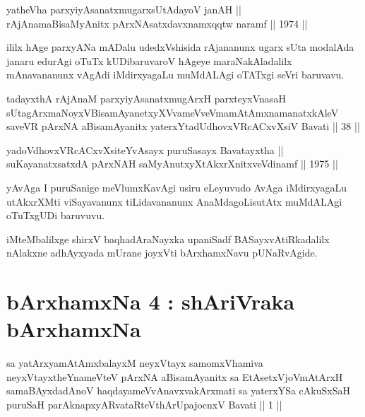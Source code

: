 
\begin{shl}
yatheVha parxyiyAsanatxmugarxsUtAdayoV janAH || \\
rAjAnamaBisaMyAnitx pArxNAsatxdavxnamxqqtw naramf \hfill || 1974 ||
  
\end{shl}

\begin{artha}
ililx hAge parxyANa mADalu udedxVshisida rAjananunx ugarx sUta
modalAda janaru edurAgi oTuTx kUDibaruvaroV hAgeye maraNakAladalilx
mAnavananunx vAgAdi iMdirxyagaLu muMdALAgi oTATxgi seVri baruvavu.
\end{artha}

\begin{shl}
tadayxthA rAjAnaM parxyiyAsanatxmugArxH parxteyxVnasaH sUtagArxmaNoyxV\s BisamAyanetxyXVvameVveVmamAtAmxnamanatxkAleV saveVR pArxNA aBisamAyanitx yaterxYtadUdhovxVRcACxvXsiV Bavati || 38 ||
\end{shl}

\begin{shl}
yadoVdhovxVRcACxvXsiteYvAsayx puruSasayx Bavatayxtha || \\
suKayanatxsatxdA pArxNAH saMyAnutxyXtAkxrXnitxveVdinamf \hfill || 1975 ||
  
\end{shl}

\begin{artha}
yAvAga I puruSanige meVlumxKavAgi usiru eLeyuvudo AvAga iMdirxyagaLu
utAkxrXMti viSayavanunx tiLidavananunx AnaMdagoLisutAtx muMdALAgi
oTuTxgUDi baruvuvu.
\end{artha}

\begin{center}
iMteMbalilxge shirxV baqhadAraNayxka upaniSadf BASayxvAtiRkadalilx
nAlakxne adhAyxyada mUrane joyxVti bArxhamxNavu  pUNaRvAgide.
\end{center}


\section*{bArxhamxNa 4 : shAriVraka bArxhamxNa}

\begin{shl}
sa yatArxyamAtAmxbalayxM neyxVtayx samomxVhamiva neyxVtayxtheYnameVteV pArxNA aBisamAyanitx sa EtAsetxVjoVmAtArxH samaBAyxdadAnoV haqdayameVvAnavxvakArxmati sa yaterxYSa cAkuSxSaH puruSaH parAknapxyARvataRteV\s thArUpajocnxV Bavati || 1 ||
\end{shl}

